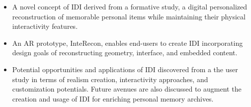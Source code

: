 \begin{itemize}
    \item A novel concept of IDI derived from a formative study, a digital personalized reconstruction of memorable personal items while maintaining their physical interactivity features.
    \item An AR prototype, InteRecon, enables end-users to create IDI incorporating design goals of reconstructing geometry, interface, and embedded content.
    \item Potential opportunities and applications of IDI discovered from a the user study in terms of realism creation, interactivity approaches, and customization potentials. Future avenues are also discussed to augment the creation and usage of IDI for enriching personal memory archives. 
\end{itemize}




